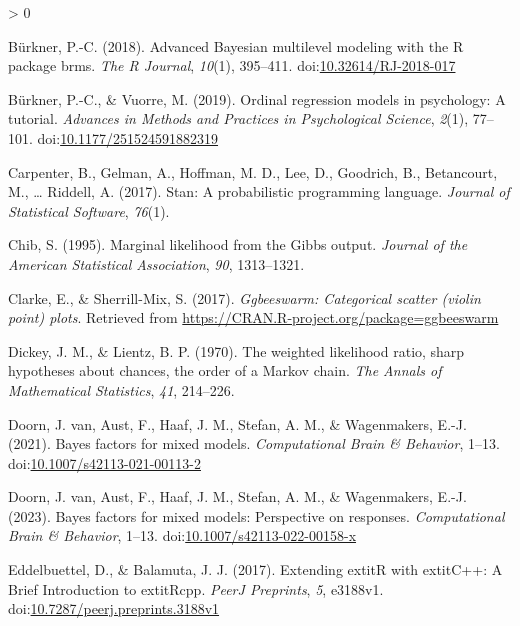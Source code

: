 \documentclass[
  english,
  doc,floatsintext]{apa6}
\newlength{\cslhangindent}
\newenvironment{CSLReferences}[2] %
 {%
  \setlength{\parindent}{0pt}
  \ifodd #1 \everypar{\setlength{\hangindent}{\cslhangindent}}\ignorespaces\fi
  \ifnum #2 > 0
  \setlength{\parskip}{#2\baselineskip}
  \fi
 }%
 {}
\begin{document}
\begin{CSLReferences}{1}{0}
\leavevmode\hypertarget{ref-R-brms_b}{}%
Bürkner, P.-C. (2018). Advanced {Bayesian} multilevel modeling with the {R} package {brms}. \emph{The R Journal}, \emph{10}(1), 395--411. doi:\href{https://doi.org/10.32614/RJ-2018-017}{10.32614/RJ-2018-017}

\leavevmode\hypertarget{ref-burkner2019ordinal}{}%
Bürkner, P.-C., \& Vuorre, M. (2019). Ordinal regression models in psychology: A tutorial. \emph{Advances in Methods and Practices in Psychological Science}, \emph{2}(1), 77--101. doi:\href{https://doi.org/10.1177/251524591882319}{10.1177/251524591882319}

\leavevmode\hypertarget{ref-carpenter2017stan}{}%
Carpenter, B., Gelman, A., Hoffman, M. D., Lee, D., Goodrich, B., Betancourt, M., \ldots{} Riddell, A. (2017). Stan: A probabilistic programming language. \emph{Journal of Statistical Software}, \emph{76}(1).

\leavevmode\hypertarget{ref-chib1995marginal}{}%
Chib, S. (1995). Marginal likelihood from the {Gibbs} output. \emph{Journal of the American Statistical Association}, \emph{90}, 1313--1321.

\leavevmode\hypertarget{ref-R-ggbeeswarm}{}%
Clarke, E., \& Sherrill-Mix, S. (2017). \emph{Ggbeeswarm: Categorical scatter (violin point) plots}. Retrieved from \url{https://CRAN.R-project.org/package=ggbeeswarm}

\leavevmode\hypertarget{ref-dickey1970weighted}{}%
Dickey, J. M., \& Lientz, B. P. (1970). The weighted likelihood ratio, sharp hypotheses about chances, the order of a {Markov} chain. \emph{The Annals of Mathematical Statistics}, \emph{41}, 214--226.

\leavevmode\hypertarget{ref-van2021bayes}{}%
Doorn, J. van, Aust, F., Haaf, J. M., Stefan, A. M., \& Wagenmakers, E.-J. (2021). Bayes factors for mixed models. \emph{Computational Brain \& Behavior}, 1--13. doi:\href{https://doi.org/10.1007/s42113-021-00113-2}{10.1007/s42113-021-00113-2}

\leavevmode\hypertarget{ref-van2023bayes}{}%
Doorn, J. van, Aust, F., Haaf, J. M., Stefan, A. M., \& Wagenmakers, E.-J. (2023). Bayes factors for mixed models: Perspective on responses. \emph{Computational Brain \& Behavior}, 1--13. doi:\href{https://doi.org/10.1007/s42113-022-00158-x}{10.1007/s42113-022-00158-x}

\leavevmode\hypertarget{ref-R-Rcpp_b}{}%
Eddelbuettel, D., \& Balamuta, J. J. (2017). {Extending extit{R} with extit{C++}: A Brief Introduction to extit{Rcpp}}. \emph{PeerJ Preprints}, \emph{5}, e3188v1. doi:\href{https://doi.org/10.7287/peerj.preprints.3188v1}{10.7287/peerj.preprints.3188v1}


\end{CSLReferences}
\end{document}
